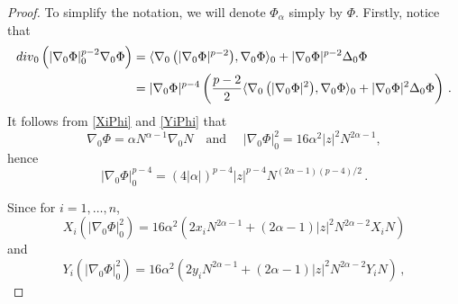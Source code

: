 \documentclass[10pt]{amsart}
\numberwithin{equation}{section}
\theoremstyle{definition}
\newcommand{\scal}[2]{\langle {#1},{#2}\rangle}
\begin{document}
\begin{proof}
To simplify the notation, we will denote $\Phi_{\alpha}$ simply by $\Phi$.
Firstly, notice that
\begin{equation}
\label{dechplap}
\begin{aligned}
{\rm div}_0\left(|\nabla_0 \Phi|_0^{p-2}\nabla_0 \Phi \right) &= \scal{\nabla_0\left( |\nabla_0 \Phi|^{p-2}\right)}{\nabla_0 \Phi}_0 + |\nabla_0 \Phi|^{p-2} \Delta_0 \Phi \\
&=|\nabla_0 \Phi|^{p-4} \left( \frac{p-2}2\scal{\nabla_0\left( |\nabla_0 \Phi|^{2}\right)}{\nabla_0 \Phi}_0 + |\nabla_0 \Phi|^{2} \Delta_0 \Phi \right) \, .
\end{aligned}
\end{equation}
It follows from \eqref{XiPhi} and \eqref{YiPhi} that
\begin{equation}
\label{nabla0Phi2}
\nabla_0 \Phi = \alpha N^{\alpha -1} \nabla_0 N \quad \textrm{and } \quad |\nabla_0 \Phi|_0^2 = 16 \alpha^2 |z|^2 N^{2\alpha -1} , 
\end{equation}
hence
\begin{equation}
\label{nablap-4}
|\nabla_0 \Phi|_0^{p-4} = (4 |\alpha|)^{p-4} |z|^{p-4} N^{(2\alpha-1)(p-4)/2} \, .
\end{equation}



Since for $i=1,\ldots,n$, 
$$X_i\left(|\nabla_0 \Phi|_0^2 \right) = 16 \alpha^2 \left( 2x_i N^{2\alpha -1} + (2\alpha -1)|z|^2 N^{2\alpha -2} X_i N\right)$$
and
$$Y_i\left(|\nabla_0 \Phi|_0^2 \right) = 16 \alpha^2 \left( 2y_i N^{2\alpha -1} + (2\alpha -1)|z|^2 N^{2\alpha -2} Y_i N\right) \, ,$$ 



\end{proof}
\end{document}
